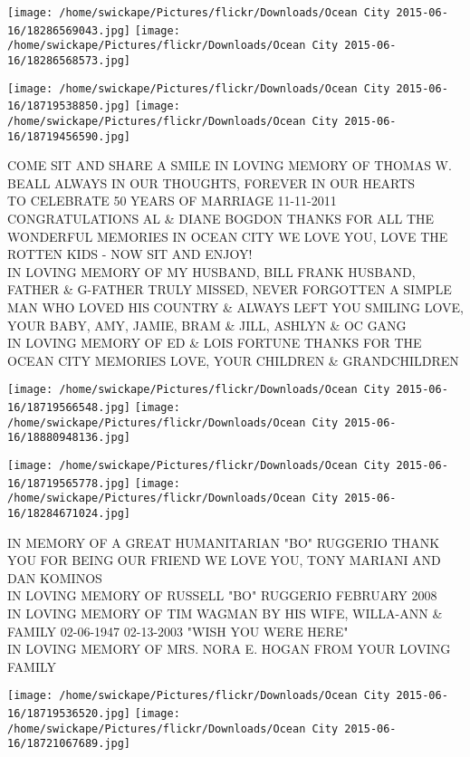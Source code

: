\documentclass[10pt,letterpaper]{article}
\begin{document}
\texttt{[image: /home/swickape/Pictures/flickr/Downloads/Ocean City 2015-06-16/18286569043.jpg]}
\texttt{[image: /home/swickape/Pictures/flickr/Downloads/Ocean City 2015-06-16/18286568573.jpg]}

\texttt{[image: /home/swickape/Pictures/flickr/Downloads/Ocean City 2015-06-16/18719538850.jpg]}
\texttt{[image: /home/swickape/Pictures/flickr/Downloads/Ocean City 2015-06-16/18719456590.jpg]}

COME SIT AND SHARE A SMILE IN LOVING MEMORY OF THOMAS W. BEALL ALWAYS IN OUR THOUGHTS, FOREVER IN OUR HEARTS\\
TO CELEBRATE 50 YEARS OF MARRIAGE 11{-}11{-}2011 CONGRATULATIONS AL \& DIANE BOGDON THANKS FOR ALL THE WONDERFUL MEMORIES IN OCEAN CITY WE LOVE YOU, LOVE THE ROTTEN KIDS {-} NOW SIT AND ENJOY!\\
IN LOVING MEMORY OF MY HUSBAND, BILL FRANK HUSBAND, FATHER \& G{-}FATHER TRULY MISSED, NEVER FORGOTTEN A SIMPLE MAN WHO LOVED HIS COUNTRY \& ALWAYS LEFT YOU SMILING LOVE, YOUR BABY, AMY, JAMIE, BRAM \& JILL, ASHLYN \& OC GANG\\
IN LOVING MEMORY OF ED \& LOIS FORTUNE THANKS FOR THE OCEAN CITY MEMORIES LOVE, YOUR CHILDREN \& GRANDCHILDREN\\
\pagebreak

\texttt{[image: /home/swickape/Pictures/flickr/Downloads/Ocean City 2015-06-16/18719566548.jpg]}
\texttt{[image: /home/swickape/Pictures/flickr/Downloads/Ocean City 2015-06-16/18880948136.jpg]}

\texttt{[image: /home/swickape/Pictures/flickr/Downloads/Ocean City 2015-06-16/18719565778.jpg]}
\texttt{[image: /home/swickape/Pictures/flickr/Downloads/Ocean City 2015-06-16/18284671024.jpg]}

IN MEMORY OF A GREAT HUMANITARIAN "BO" RUGGERIO THANK YOU FOR BEING OUR FRIEND WE LOVE YOU, TONY MARIANI AND DAN KOMINOS\\
IN LOVING MEMORY OF RUSSELL "BO" RUGGERIO FEBRUARY 2008\\
IN LOVING MEMORY OF TIM WAGMAN BY HIS WIFE, WILLA{-}ANN \& FAMILY 02{-}06{-}1947 02{-}13{-}2003 "WISH YOU WERE HERE"\\
IN LOVING MEMORY OF MRS. NORA E. HOGAN FROM YOUR LOVING FAMILY\\
\pagebreak

\texttt{[image: /home/swickape/Pictures/flickr/Downloads/Ocean City 2015-06-16/18719536520.jpg]}
\texttt{[image: /home/swickape/Pictures/flickr/Downloads/Ocean City 2015-06-16/18721067689.jpg]}
\end{document}
